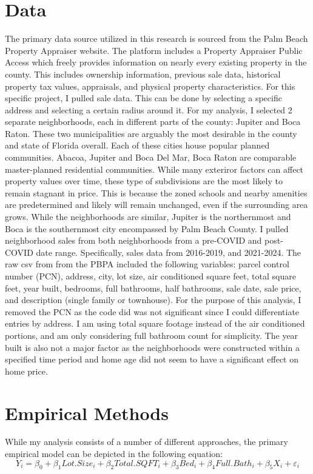 \documentclass[12pt,english]{article}
\begin{document}
\section{Data}\label{sec:data}
The primary data source utilized in this research is sourced from the Palm Beach Property Appraiser website. The platform includes a Property Appraiser Public Access which freely provides information on nearly every existing property in the county. This includes ownership information, previous sale data, historical property tax values, appraisals, and physical property characteristics. For this specific project, I pulled sale data. This can be done by selecting a specific address and selecting a certain radius around it. For my analysis, I selected 2 separate neighborhoods, each in different parts of the county: Jupiter and Boca Raton. These two municipalities are arguably the most desirable in the county and state of Florida overall. Each of these cities house popular planned communities. Abacoa, Jupiter and Boca Del Mar, Boca Raton are comparable master-planned residential communities. While many exteriror factors can affect property values over time, these type of subdivisions are the most likely to remain stagnant in price. This is because the zoned schools and nearby amenities are predetermined and likely will remain unchanged, even if the surrounding area grows. While the neighborhoods are similar, Jupiter is the northernmost and Boca is the southernmost city encompassed by Palm Beach County. I pulled neighborhood sales from both neighborhoods from a pre-COVID and post-COVID date range. Specifically, sales data from 2016-2019, and 2021-2024. The raw csv from from the PBPA included the following variables: parcel control number (PCN), address, city, lot size, air conditioned square feet, total square feet, year built, bedrooms, full bathrooms, half bathrooms, sale date, sale price, and description (single family or townhouse). For the purpose of this analysis, I removed the PCN as the code did was not significant since I could differentiate entries by address. I am using total square footage instead of the air conditioned portions, and am only considering full bathroom count for simplicity. The year built is also not a major factor as the neighborhoods were constructed within a specified time period and home age did not seem to have a significant effect on home price. 



\section{Empirical Methods}\label{sec:methods}
While my analysis consists of a number of different approaches, the primary empirical model can be depicted in the following equation:
\begin{equation}
\label{eq:1}
Y_i = \beta_{0} + \beta_{1}Lot.Size_i + \beta_{2}Total.SQFT_i + \beta_{3}Bed_i + \beta_{4}Full.Bath_i + \beta_{5}X_i + \varepsilon_i
\end{equation}
\end{document}
